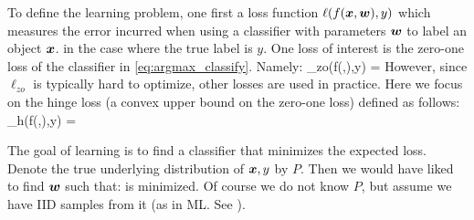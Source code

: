 To define the learning problem, one first a loss function $\ell(f(\boldsymbol{x},\boldsymbol{w}),y)$ which measures the error incurred when using a classifier with parameters $\boldsymbol{w}$ to label an object $\boldsymbol{x}$. in the case
where the true label is $y$. One loss of interest is the zero-one loss of the classifier in \eqref{eq:argmax_classify}. Namely:
\be
\ell_{zo}(f(\xx,\ww),y) = 
\ee
However, since $\ell_{zo}$ is typically hard to optimize, other losses are used in practice. Here we focus on the hinge loss (a convex upper bound on the zero-one loss) defined as follows:
\be
\ell_{h}(f(\xx,\ww),y) = 
\ee
 
The goal of learning is to find a classifier that minimizes the expected loss. Denote the true underlying distribution of $\boldsymbol{x},y$ by $P$. Then we would have liked to 
find $\boldsymbol{w}$ such that:
\be
{}
\label{eq:true_risk}
\ee
is minimized. Of course we do not know $P$, but assume we have IID samples from it (as in ML. See ).


